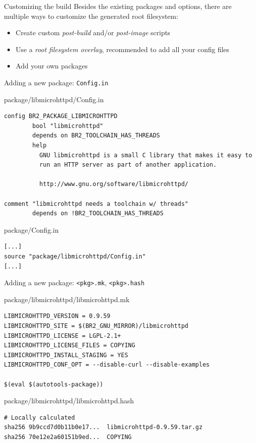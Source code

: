 \documentclass[aspectratio=169,obeyspaces,spaces,hyphens,dvipsnames]{beamer}
\begin{document}
\begin{frame}{Customizing the build}
  Besides the existing packages and options, there are multiple ways
  to customize the generated root filesystem:
  \begin{itemize}
  \item Create custom {\em post-build} and/or {\em post-image} scripts
  \item Use a {\em root filesystem overlay}, recommended to add all
    your config files
  \item Add your own packages
  \end{itemize}
\end{frame}

\begin{frame}[fragile]{Adding a new package: {\tt Config.in}}
  \begin{block}{package/libmicrohttpd/Config.in}
\tiny
\begin{verbatim}
config BR2_PACKAGE_LIBMICROHTTPD
        bool "libmicrohttpd"
        depends on BR2_TOOLCHAIN_HAS_THREADS
        help
          GNU libmicrohttpd is a small C library that makes it easy to
          run an HTTP server as part of another application.

          http://www.gnu.org/software/libmicrohttpd/

comment "libmicrohttpd needs a toolchain w/ threads"
        depends on !BR2_TOOLCHAIN_HAS_THREADS
\end{verbatim}
  \end{block}

  \begin{block}{package/Config.in}
\begin{verbatim}
[...]
source "package/libmicrohttpd/Config.in"
[...]
\end{verbatim}
  \end{block}
\end{frame}

\begin{frame}[fragile]{Adding a new package: {\tt <pkg>.mk}, {\tt <pkg>.hash}}
  \begin{block}{package/libmicrohttpd/libmicrohttpd.mk}
\begin{verbatim}
LIBMICROHTTPD_VERSION = 0.9.59
LIBMICROHTTPD_SITE = $(BR2_GNU_MIRROR)/libmicrohttpd
LIBMICROHTTPD_LICENSE = LGPL-2.1+
LIBMICROHTTPD_LICENSE_FILES = COPYING
LIBMICROHTTPD_INSTALL_STAGING = YES
LIBMICROHTTPD_CONF_OPT = --disable-curl --disable-examples

$(eval $(autotools-package))
\end{verbatim}
  \end{block}

\begin{block}{package/libmicrohttpd/libmicrohttpd.hash}
\begin{verbatim}
# Locally calculated
sha256 9b9ccd7d0b11b0e17...  libmicrohttpd-0.9.59.tar.gz
sha256 70e12e2a60151b9ed...  COPYING
\end{verbatim}
\end{block}

\end{frame}
\end{document}
